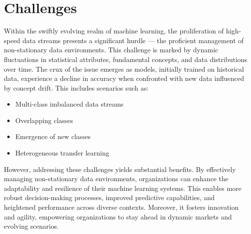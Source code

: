 \section{Challenges}
\label{sec:1_introduction_challange}
Within the swiftly evolving realm of machine learning, the proliferation of high-speed data streams presents a significant hurdle — the proficient management of non-stationary data environments. This challenge is marked by dynamic fluctuations in statistical attributes, fundamental concepts, and data distributions over time. The crux of the issue emerges as models, initially trained on historical data, experience a decline in accuracy when confronted with new data influenced by concept drift. This includes scenarios such as:
\begin{itemize}
    \item Multi-class imbalanced data streams
    \item Overlapping classes
    \item Emergence of new classes
    \item Heterogeneous transfer learning
\end{itemize}
However, addressing these challenges yields substantial benefits. By effectively managing non-stationary data environments, organizations can enhance the adaptability and resilience of their machine learning systems. This enables more robust decision-making processes, improved predictive capabilities, and heightened performance across diverse contexts. Moreover, it fosters innovation and agility, empowering organizations to stay ahead in dynamic markets and evolving scenarios.